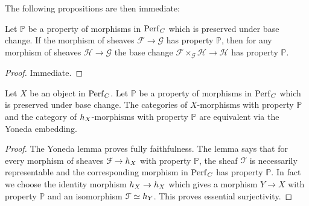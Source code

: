 The following propositions are then immediate:

\begin{prop}
Let $\mathbb{P}$ be a property of morphisms in $\mathrm{Perf}_{C}$ which is preserved under base change.
If the morphism of sheaves $\mathcal{F}\to\mathcal{G}$ has property $\mathbb{P}$, then for any morphism of sheaves $\mathcal{H}\to\mathcal{G}$ the base change
$\mathcal{F}\times_{\mathcal{G}}{\mathcal{H}}\to\mathcal{H}$ has property $\mathbb{P}$.
\end{prop}
\begin{proof}
Immediate.
\end{proof}

\begin{prop}
Let $X$ be an object in $\mathrm{Perf}_{C}$. Let $\mathbb{P}$ be a property of morphisms in $\mathrm{Perf}_{C}$ which is preserved under base change.
The categories of $X$-morphisms with property $\mathbb{P}$ and the category of ${h_{X}}$-morphisms with property $\mathbb{P}$ are equivalent via the Yoneda embedding. 
\end{prop}
\begin{proof}
The Yoneda lemma proves fully faithfulness. The lemma says that for every morphism of sheaves $\mathcal{F}\to{h_{X}}$ with property $\mathbb{P}$, the sheaf $\mathcal{F}$ is necessarily representable and the corresponding morphism in $\mathrm{Perf}_{C}$ has property $\mathbb{P}$. 
In fact we choose the identity morphism ${h_{X}}\to{h_{X}}$ which gives a morphism $Y\to X$ with property $\mathbb{P}$ and an isomorphism 
$\mathcal{F}\simeq{h_{Y}}$. This proves essential surjectivity.
\end{proof}

